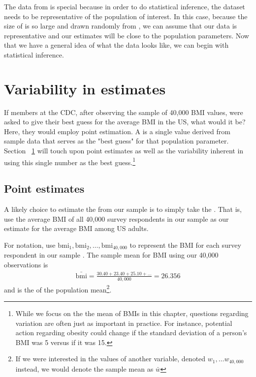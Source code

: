The data from  is special because in order to do statistical inference, the dataset needs to be representative of the population of interest. In this case, because the size of  is so large and drawn randomly from , we can assume that our data is representative and our estimates will be close to the population parameters.  Now that we have a general idea of what the data looks like, we can begin with statistical inference.

\section{Variability in estimates}
\label{variabilityInEstimates}


If members at the CDC, after observing the sample of 40,000 BMI values, were asked to give their best guess for the average BMI in the US, what would it be? Here, they would employ point estimation. A  is a single value derived from sample data that serves as the "best guess" for that population parameter. Section ~\ref{variabilityInEstimates} will touch upon point estimates as well as the variability inherent in using this single number as the best guess.\footnote{While we focus on the the mean of BMIs in this chapter, questions regarding variation are often just as important in practice. For instance, potential action regarding obesity could change if the standard deviation of a person's BMI was 5 versus if it was 15.} 

\subsection{Point estimates}
\label{pointEstimates}

A likely choice to estimate the  from our sample is to simply take the . That is, use the average BMI of all 40,000 survey respondents in our sample as our estimate for the average BMI among US adults. 

For notation, use $\mathrm{bmi}_1, \mathrm{bmi}_2, \ldots, \mathrm{bmi}_{40,000}$  to represent the BMI for each survey respondent in our sample . The sample mean for BMI using our 40,000 observations is 
\begin{eqnarray*}
\bar{\mathrm{bmi}} = \frac{30.40 + 23.40 + 25.10 + \dots}{40,000} = 26.356
\end{eqnarray*}
and is the  of the population mean\footnote{If we were interested in the values of another variable,  denoted $w_1,\ldots w_{40,000}$ instead, we would denote the sample mean as $\bar{w}$}. 

